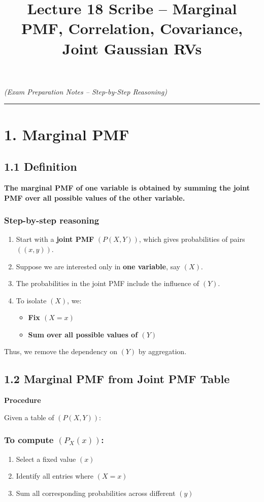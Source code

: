 \documentclass[12pt]{article}
\title{Lecture 18 Scribe – Marginal PMF, Correlation, Covariance, Joint Gaussian RVs}
\date{}
\begin{document}
\maketitle

\textit{(Exam Preparation Notes – Step-by-Step Reasoning)}

\hrule

\section*{1. Marginal PMF}

\subsection*{1.1 Definition}

\textbf{The marginal PMF of one variable is obtained by summing the joint PMF over all possible values of the other variable.}

\subsubsection*{Step-by-step reasoning}

\begin{enumerate}
\item Start with a \textbf{joint PMF} $(P(X,Y))$, which gives probabilities of pairs $((x,y))$.
\item Suppose we are interested only in \textbf{one variable}, say $(X)$.
\item The probabilities in the joint PMF include the influence of $(Y)$.
\item To isolate $(X)$, we:
\begin{itemize}
\item \textbf{Fix $(X = x)$}
\item \textbf{Sum over all possible values of $(Y)$}
\end{itemize}
\end{enumerate}

Thus, we remove the dependency on $(Y)$ by aggregation.

\subsection*{1.2 Marginal PMF from Joint PMF Table}

\textbf{Procedure}

Given a table of $(P(X,Y))$:

\subsubsection*{To compute $(P_X(x))$:}
\begin{enumerate}
\item Select a fixed value $(x)$
\item Identify all entries where $(X = x)$
\item Sum all corresponding probabilities across different $(y)$
\end{enumerate}
\end{document}
